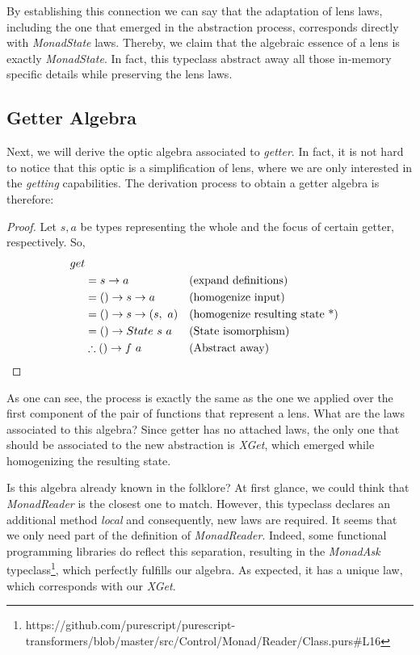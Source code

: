 \documentclass[a4paper]{article}
\begin{document}
By establishing this connection we can say that the adaptation of lens laws,
including the one that emerged in the abstraction process, corresponds directly
with \emph{MonadState} laws. Thereby, we claim that the algebraic essence of a
lens is exactly \emph{MonadState}. In fact, this typeclass abstract away all
those in-memory specific details while preserving the lens laws.

\subsection{Getter Algebra}

Next, we will derive the optic algebra associated to \emph{getter}. In fact, it
is not hard to notice that this optic is a simplification of lens, where we are
only interested in the \emph{getting} capabilities. The derivation process to
obtain a getter algebra is therefore:

\begin{proof}
  Let $s, a$ be types representing the whole and the focus of certain getter,
  respectively. So,
  \begin{align*}
    get \\
    &= s \rightarrow a &&\text{(expand definitions)} \\
    &= () \rightarrow s \rightarrow a &&\text{(homogenize input)} \\
    &= () \rightarrow s \rightarrow (s,\ a) &&\text{(homogenize resulting state *)} \\
    &= () \rightarrow State\ s\ a &&\text{(State isomorphism)} \\
    &\therefore () \rightarrow f\ a &&\text{(Abstract away)}\qedhere
  \end{align*}
\end{proof}

As one can see, the process is exactly the same as the one we applied over the
first component of the pair of functions that represent a lens. What are the
laws associated to this algebra? Since getter has no attached laws, the only one
that should be associated to the new abstraction is \emph{XGet}, which emerged
while homogenizing the resulting state.

Is this algebra already known in the folklore? At first glance, we could think
that \emph{MonadReader} is the closest one to match. However, this typeclass
declares an additional method \emph{local} and consequently, new laws are
required. It seems that we only need part of the definition of
\emph{MonadReader}. Indeed, some functional programming libraries do reflect
this separation, resulting in the \emph{MonadAsk}
typeclass\footnote{https://github.com/purescript/purescript-transformers/blob/master/src/Control/Monad/Reader/Class.purs#L16},
which perfectly fulfills our algebra. As expected, it has a unique law, which
corresponds with our \emph{XGet}.
\end{document}
